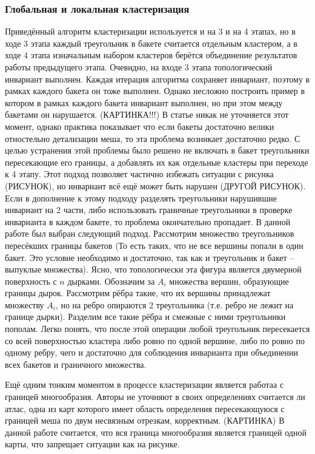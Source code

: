 \documentclass[12pt]{extarticle}
\begin{document}
\subsubsection{Глобальная и локальная кластеризация}
Приведённый алгоритм кластеризации используется и на 3 и на 4 этапах, но в ходе 3 этапа каждый треугольник в бакете считается отдельным кластером, а в ходе 4 этапа изначальным набором кластеров берётся объединение результатов работы предыдущего этапа. Очевидно, на входе 3 этапа топологический инвариант выполнен. Каждая итерация алгоритма сохраняет инвариант, поэтому в рамках каждого бакета он тоже выполнен. Однако несложно построить пример в котором в рамках каждого бакета инвариант выполнен, но при этом между бакетами он нарушается. (КАРТИНКА!!!) В статье \cite{niski2007multi} никак не уточняется этот момент, однако практика показывает что если бакеты достаточно велики отностельно детализации меша, то эта проблема возникает достаточно редко. С целью устранения этой проблемы было решено не включать в бакет треугольники пересекающие его границы, а добавлять их как отдельные кластеры при переходе к 4 этапу. Этот подход позволяет частично избежать ситуации с рисунка (РИСУНОК), но инвариант всё ещё может быть нарушен (ДРУГОЙ РИСУНОК). Если в дополнение к этому подходу разделять треугольники нарушившие инвариант на 2 части, либо использовать граничные треугольники в проверке инварианта в каждом бакете, то проблема окончательно пропадает. В данной работе был выбран следующий подход. Рассмотрим множество треугольников пересёкших границы бакетов (То есть таких, что не все вершины попали в один бакет. Это условие необходимо и достаточно, так как и треугольник и бакет -- выпуклые множества). Ясно, что топологически эта фигура является двумерной поверхность с $n$ дырками. Обозначим за $A_i$ множества вершин, образующие границы дырок. Рассмотрим рёбра такие, что их вершины принадлежат множеству $A_i$, но на ребро опираются 2 треугольника (т.е. ребро не лежит на границе дырки). Разделим все такие рёбра и смежные с ними треугольники пополам. Легко понять, что после этой операции любой треугольник пересекается со всей поверхностью кластера либо ровно по одной вершине, либо по ровно по одному ребру, чего и достаточно для соблюдения инварианта при объединении всех бакетов и граничного множества.

Ещё одним тонким моментом в процессе кластеризации является работаа с границей многообразия. Авторы \cite{purnomo2004} не уточняют в своих определениях считается ли атлас, одна из карт которого имеет область определения пересекающуюся с границей меша по двум несвязным отрезкам, корректным. (КАРТИНКА) В данной работе считается, что вся граница многообразия является границей одной карты, что запрещает ситуации как на рисунке.
\end{document}

